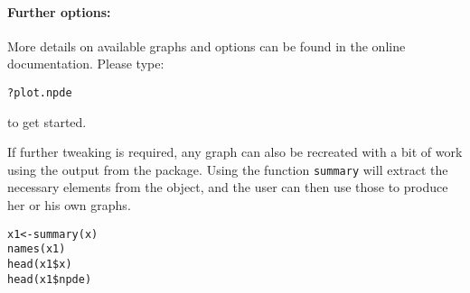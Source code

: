 \paragraph{Further options:} More details on available graphs and options can be found in the online documentation. Please type:
\begin{verbatim}
?plot.npde
\end{verbatim}
to get started.

If further tweaking is required, any graph can also be recreated with a bit of work using the output from the package. Using the function \texttt{summary} will extract the necessary elements from the object, and the user can then use those to produce her or his own graphs.
\begin{verbatim}
x1<-summary(x)
names(x1)
head(x1$x)
head(x1$npde)
\end{verbatim}

\clearpage
\newpage
